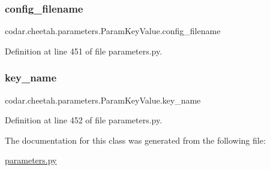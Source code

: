 \subsubsection{\texorpdfstring{config\+\_\+filename}{config\_filename}}
{\footnotesize\ttfamily codar.\+cheetah.\+parameters.\+Param\+Key\+Value.\+config\+\_\+filename}



Definition at line 451 of file parameters.\+py.

\mbox{\label{classcodar_1_1cheetah_1_1parameters_1_1_param_key_value_aed81003e4524c70ca0329433fa677f6c}} 
\subsubsection{\texorpdfstring{key\+\_\+name}{key\_name}}
{\footnotesize\ttfamily codar.\+cheetah.\+parameters.\+Param\+Key\+Value.\+key\+\_\+name}



Definition at line 452 of file parameters.\+py.



The documentation for this class was generated from the following file\+:\begin{DoxyCompactItemize}
\item 
\hyperlink{parameters_8py}{parameters.\+py}\end{DoxyCompactItemize}
